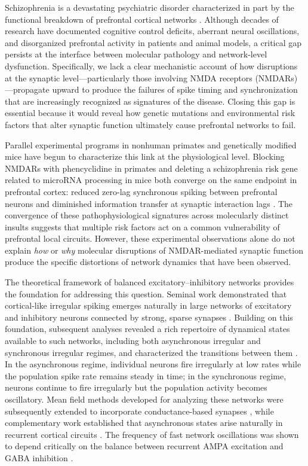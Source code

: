 \documentclass[10pt]{article}
\begin{document}
Schizophrenia is a devastating psychiatric disorder characterized in part by the functional breakdown of prefrontal cortical networks \citep{insel2010rethinking, jauhar2022schizophrenia}. Although decades of research have documented cognitive control deficits, aberrant neural oscillations, and disorganized prefrontal activity in patients and animal models, a critical gap persists at the interface between molecular pathology and network-level dysfunction. Specifically, we lack a clear mechanistic account of how disruptions at the synaptic level---particularly those involving NMDA receptors (NMDARs)---propagate upward to produce the failures of spike timing and synchronization that are increasingly recognized as signatures of the disease. Closing this gap is essential because it would reveal how genetic mutations and environmental risk factors that alter synaptic function ultimately cause prefrontal networks to fail.

Parallel experimental programs in nonhuman primates and genetically modified mice have begun to characterize this link at the physiological level. Blocking NMDARs with phencyclidine in primates and deleting a schizophrenia risk gene related to microRNA processing in mice both converge on the same endpoint in prefrontal cortex: reduced zero-lag synchronous spiking between prefrontal neurons and diminished information transfer at synaptic interaction lags \citep{zick2018blocking, kummerfeld2020cognitive, zick2021disparate}. The convergence of these pathophysiological signatures across molecularly distinct insults suggests that multiple risk factors act on a common vulnerability of prefrontal local circuits. However, these experimental observations alone do not explain \textit{how} or \textit{why} molecular disruptions of NMDAR-mediated synaptic function produce the specific distortions of network dynamics that have been observed.

The theoretical framework of balanced excitatory--inhibitory networks provides the foundation for addressing this question. Seminal work demonstrated that cortical-like irregular spiking emerges naturally in large networks of excitatory and inhibitory neurons connected by strong, sparse synapses \citep{vanvreeswijk1996chaos}. Building on this foundation, subsequent analyses revealed a rich repertoire of dynamical states available to such networks, including both asynchronous irregular and synchronous irregular regimes, and characterized the transitions between them \citep{brunel2000dynamics}. In the asynchronous regime, individual neurons fire irregularly at low rates while the population spike rate remains steady in time; in the synchronous regime, neurons continue to fire irregularly but the population activity becomes oscillatory. Mean field methods developed for analyzing these networks \citep{amit1997model, brunel2000dynamics} were subsequently extended to incorporate conductance-based synapses \citep{brunel2001effects}, while complementary work established that asynchronous states arise naturally in recurrent cortical circuits \citep{renart2010asynchronous}. The frequency of fast network oscillations was shown to depend critically on the balance between recurrent AMPA excitation and GABA inhibition \citep{brunel2003fast, brunel1999fast}.
\end{document}

